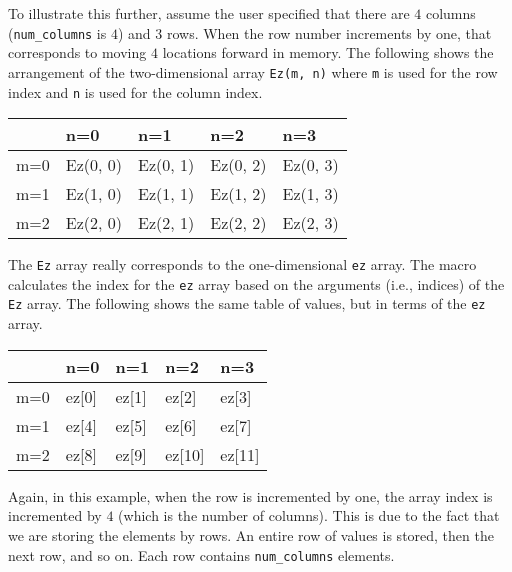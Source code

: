 To illustrate this further, assume the user specified that there are
$4$ columns ({\tt num\_columns} is $4$) and $3$ rows.  When the row
number increments by one, that corresponds to moving $4$ locations
forward in memory.  The following shows the arrangement of the
two-dimensional array {\tt Ez(m, n)} where {\tt m} is used for the row
index and {\tt n} is used for the column index.
\begin{center}
\begin{tabular}{l|llll}
    &n=0     & n=1     & n=2     & n=3     \\ \hline
m=0 &Ez(0, 0) & Ez(0, 1) & Ez(0, 2) & Ez(0, 3) \\
m=1 &Ez(1, 0) & Ez(1, 1) & Ez(1, 2) & Ez(1, 3) \\
m=2 &Ez(2, 0) & Ez(2, 1) & Ez(2, 2) & Ez(2, 3)
\end{tabular}
\end{center}
The {\tt Ez} array really corresponds to the one-dimensional {\tt ez}
array.  The macro calculates the index for the {\tt ez} array based on
the arguments (i.e., indices) of the {\tt Ez} array.  The following
shows the same table of values, but in terms of the {\tt ez} array.
\begin{center}
\begin{tabular}{l|llll}
    &n=0     & n=1     & n=2     & n=3     \\ \hline
m=0 &ez[0]   & ez[1]   & ez[2]   & ez[3] \\
m=1 &ez[4]   & ez[5]   & ez[6]   & ez[7] \\
m=2 &ez[8]   & ez[9]   & ez[10]  & ez[11]
\end{tabular}
\end{center}
Again, in this example, when the row is incremented by one, the array
index is incremented by $4$ (which is the number of columns).  This is
due to the fact that we are storing the elements by rows.  An entire
row of values is stored, then the next row, and so on.  Each row
contains {\tt num\_columns} elements.

